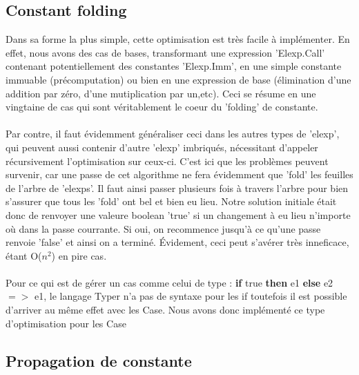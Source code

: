 \documentclass{article}
\begin{document}
\subsection{Constant folding}

Dans sa forme la plus simple, cette optimisation est très facile à implémenter.
En effet, nous avons des cas de bases, transformant une expression 'Elexp.Call'
contenant potentiellement des constantes 'Elexp.Imm', en une simple constante
immuable (précomputation) ou bien en une expression de base (élimination d'une
addition par zéro, d'une mutiplication par un,etc). Ceci se résume en une
vingtaine de cas qui sont véritablement le coeur du 'folding' de constante.

\paragraph{}
Par contre, il faut évidemment généraliser ceci dans les autres types de
'elexp', qui peuvent aussi contenir d'autre 'elexp' imbriqués, nécessitant
d'appeler récursivement l'optimisation sur ceux-ci. C'est ici que les problèmes
peuvent survenir, car une passe de cet algorithme ne fera évidemment que 'fold'
les feuilles de l'arbre de 'elexps'. Il faut ainsi passer plusieurs fois à
travers l'arbre pour bien s'assurer que tous les 'fold' ont bel et bien eu
lieu. Notre solution initiale était donc de renvoyer une valeure boolean 'true'
si un changement à eu lieu n'importe où dans la passe courrante. Si oui, on
recommence jusqu'à ce qu'une passe renvoie 'false' et ainsi on a terminé.
Évidement, ceci peut s'avérer très inneficace, étant O($n^2$) en pire cas.

\paragraph{}
Pour ce qui est de gérer un cas comme celui de type : \textbf{if} true
\textbf{then} e1 \textbf{else} e2 $=>$ e1, le langage Typer n'a pas de
syntaxe pour les if toutefois il est possible d'arriver au même effet
avec les Case. Nous avons donc implémenté ce type d'optimisation pour les Case 

\subsection{Propagation de constante}
\end{document}
